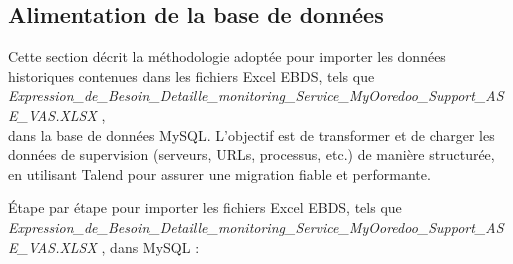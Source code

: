 \subsection{Alimentation de la base de données}
Cette section décrit la méthodologie adoptée pour importer les données historiques contenues dans les fichiers Excel EBDS, tels que \\\textit{Expression\_de\_Besoin\_Detaille\_monitoring\_Service\_MyOoredoo\_Support\_ASE\_VAS.XLSX} , \\ dans la base de données MySQL. L’objectif est de transformer et de charger les données de supervision (serveurs, URLs, processus, etc.) de manière structurée, en utilisant Talend pour assurer une migration fiable et performante.

Étape par étape pour importer les fichiers Excel EBDS, tels que \\\textit{Expression\_de\_Besoin\_Detaille\_monitoring\_Service\_MyOoredoo\_Support\_ASE\_VAS.XLSX} , dans MySQL :

